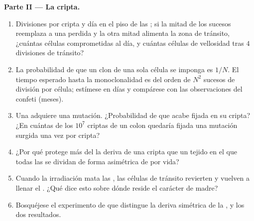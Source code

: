 \begin{problem}
\medskip
\noindent\textbf{Parte II --- La cripta.}
\begin{enumerate}[resume]
  \item Divisiones por cripta y día en el piso de las ; si
        la mitad de los sucesos reemplaza a una  perdida y
        la otra mitad alimenta la zona de tránsito, ¿cuántas células
        comprometidas al día, y cuántas células de vellosidad tras $4$
        divisiones de tránsito?
  \item La probabilidad de que un clon de una sola célula se imponga es
        $1/N$. El tiempo esperado hasta la monoclonalidad es del orden
        de $N^{2}$ sucesos de división por célula; estímese en días y
        compárese con las observaciones del confeti (meses).
  \item Una  adquiere una mutación. ¿Probabilidad de que
        acabe fijada en su cripta? ¿En cuántas de los $10^{7}$ criptas
        de un colon quedaría fijada una mutación surgida una vez por
        cripta?
  \item ¿Por qué protege más del  la deriva de una cripta que un
        tejido en el que todas las  se dividan de forma
        asimétrica de por vida?
  \item Cuando la irradiación mata las , las células de
        tránsito revierten y vuelven a llenar el . ¿Qué dice esto
        sobre dónde reside el carácter de madre?
  \item Bosquéjese el experimento de  que distingue
        la deriva simétrica de la , y los dos
        resultados.
\end{enumerate}


\end{problem}

